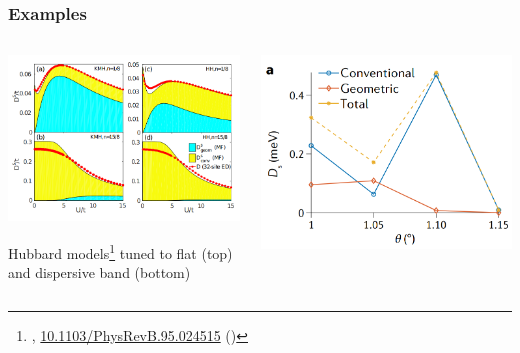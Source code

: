 \documentclass[aspectratio=169]{beamer}
\begin{document}
		

\begin{frame}
	\frametitle{Examples}
	
	\begin{columns}[T]
		\begin{column}{0.5\textwidth}
			\begin{center}
				\includegraphics[width=0.8\linewidth]{"figs/Superfluid weight Hexagonal Lattice"}
				
				Hubbard models\footnote[frame]{\citeauthor{liangBandGeometryBerry2017}, \href{https://doi.org/10.1103/PhysRevB.95.024515}{10.1103/PhysRevB.95.024515} (\citeyear{liangBandGeometryBerry2017})} tuned to flat (top) and dispersive band (bottom)
			\end{center}
		\end{column}\pause
		\begin{column}{0.5\textwidth}
			\begin{center}
				\includegraphics[width=0.7\linewidth]{"figs/Superfluid weight TBG"}
				

\end{center}
\end{column}
\end{columns}
\end{frame}
\end{document}
